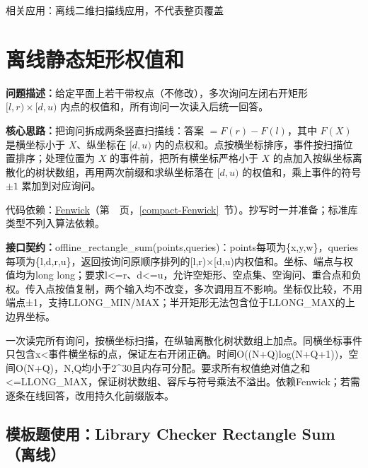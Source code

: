 

\noindent 相关应用：离线二维扫描线应用，不代表整页覆盖

\section{离线静态矩形权值和}\label{compact-offline_rectangle_sum}

\noindent\textbf{问题描述：}\allowbreak 给定平面上若干带权点（不修改），多次询问左闭右开矩形 $[l,r)\times[d,u)$ 内点的权值和，所有询问一次读入后统一回答。

\textbf{核心思路：}\allowbreak 把询问拆成两条竖直扫描线：答案 $=F(r)-F(l)$，其中 $F(X)$ 是横坐标小于 $X$、纵坐标在 $[d,u)$ 内的点权和。点按横坐标排序，事件按扫描位置排序；处理位置为 $X$ 的事件前，把所有横坐标严格小于 $X$ 的点加入按纵坐标离散化的树状数组，再用两次前缀和求纵坐标落在 $[d,u)$ 的权值和，乘上事件的符号 $\pm1$ 累加到对应询问。

代码依赖：\hyperref[compact-Fenwick]{Fenwick}（第~\pageref{compact-Fenwick}~页，\ref{compact-Fenwick}~节）。抄写时一并准备；标准库类型不列入算法依赖。

{\sloppy{}\noindent\textbf{接口契约：}offline\_rectangle\_sum(points,queries)：points每项为\{x,y,w\}，queries每项为\{l,d,r,u\}，返回按询问原顺序排列的[l,r)×[d,u)内权值和。坐标、端点与权值均为long long；要求l<=r、d<=u，允许空矩形、空点集、空询问、重合点和负权。传入点按值复制，两个输入均不改变，多次调用互不影响。坐标仅比较，不用端点±1，支持LLONG\_MIN/MAX；半开矩形无法包含位于LLONG\_MAX的上边界坐标。

一次读完所有询问，按横坐标扫描，在纵轴离散化树状数组上加点。同横坐标事件只包含x<事件横坐标的点，保证左右开闭正确。时间O((N+Q)log(N+Q+1))，空间O(N+Q)，N,Q均小于2\textasciicircum{}30且内存可分配。要求所有权值绝对值之和<=LLONG\_MAX，保证树状数组、容斥与符号乘法不溢出。依赖Fenwick；若需逐条在线回答，改用持久化前缀版本。\par}



\newpage

\Needspace{351pt}

\subsection*{模板题使用：Library Checker Rectangle Sum（离线）}

